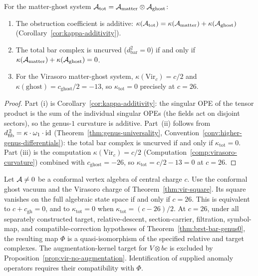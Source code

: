\begin{theorem}\label{thm:anomaly-koszul}
For the matter-ghost system
$\mathcal{A}_{\mathrm{tot}} = \mathcal{A}_{\mathrm{matter}} \otimes \mathcal{A}_{\mathrm{ghost}}$:
\begin{enumerate}[label=\textup{(\roman*)}]
\item The obstruction coefficient is additive:
  $\kappa(\mathcal{A}_{\mathrm{tot}}) = \kappa(\mathcal{A}_{\mathrm{matter}}) + \kappa(\mathcal{A}_{\mathrm{ghost}})$
  \textup{(}Corollary~\textup{\ref{cor:kappa-additivity})}.
\item The total bar complex is uncurved
  ($d_{\mathrm{bar}}^2 = 0$) if and only if
  $\kappa(\mathcal{A}_{\mathrm{matter}}) + \kappa(\mathcal{A}_{\mathrm{ghost}}) = 0$.
\item For the Virasoro matter-ghost system,
  $\kappa(\mathrm{Vir}_c) = c/2$ and
  $\kappa(\mathrm{ghost}) = c_{\mathrm{ghost}}/2 = -13$, so
  $\kappa_{\mathrm{tot}} = 0$ precisely at $c = 26$.
\end{enumerate}
\end{theorem}

\begin{proof}
Part (i) is Corollary~\ref{cor:kappa-additivity}: the singular OPE
of the tensor product is the sum of the individual singular OPEs
(the fields act on disjoint sectors), so the genus-$1$ curvature
is additive.  Part~(ii) follows from
$d_{\mathrm{fib}}^{\,2} = \kappa \cdot \omega_1 \cdot \mathrm{id}$
(Theorem~\ref{thm:genus-universality},
Convention~\ref{conv:higher-genus-differentials}): the total bar complex is
uncurved if and only if $\kappa_{\mathrm{tot}} = 0$.  Part (iii)
is the computation $\kappa(\mathrm{Vir}_c) = c/2$
(Computation~\ref{comp:virasoro-curvature}) combined with
$c_{\mathrm{ghost}} = -26$, so
$\kappa_{\mathrm{tot}} = c/2 - 13 = 0$ at $c = 26$.
\end{proof}

\begin{theorem}\label{thm:anomaly-physical-genus0}
Let $\mathcal{A}\neq0$ be a conformal vertex algebra of central charge $c$.
Use the conformal ghost vacuum and the Virasoro charge of Theorem~\ref{thm:vir-square}.
Its square vanishes on the full algebraic state space if and only if $c=26$.
This is equivalent to $c+c_{\mathrm{gh}}=0$, and to $\kappa_{\mathrm{tot}}=0$ when $\kappa_{\mathrm{tot}}=(c-26)/2$.
At $c=26$, under all separately constructed target, relative-descent, section-carrier, filtration, symbol-map, and compatible-correction hypotheses of Theorem~\ref{thm:brst-bar-genus0}, the resulting map $\Phi$ is a quasi-isomorphism of the specified relative and target complexes. The augmentation-kernel target for $V\otimes bc$ is excluded by Proposition~\ref{prop:vir-no-augmentation}.
Identification of supplied anomaly operators requires their compatibility with $\Phi$.
\end{theorem}

